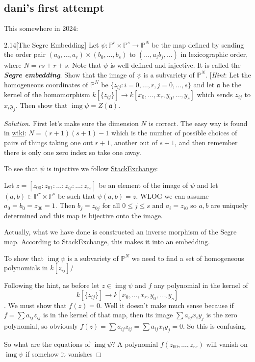 \subsection*{dani's first attempt}
This somewhere in 2024:
\begin{manualexercise}{2.14}[The Segre Embedding]
	Let $\psi:\mathbb{P}^r\times\mathbb{P}^s\to\mathbb{P}^N$ be the map defined by sending the order pair $(a_0,\ldots,a_r)\times(b_0,\ldots,b_s)$ to $(\ldots,a_ib_j,\ldots)$ in lexicographic order, where $N=rs+r+s$. Note that $\psi$ is well-defined and injective. It is called the \textbf{\textit{Segre embedding}}. Show that the image of $\psi$ is a subvariety of $\mathbb{P}^N$. [\textit{Hint}: Let the homogeneous coordinates of $\mathbb{P}^N$ be $\{z_{ij}:i=0,\ldots,r,j=0,\ldots,s\}$ and let $\mathfrak{a}$ be the kernel of the homomorphism $k[\{z_{ij}\}]\to k[x_0,\ldots,x_r,y_0,\ldots,y_s]$ which sends $z_{ij}$ to $x_iy_j$. Then show that $\operatorname{img}\psi=Z(\mathfrak{a})$.
\end{manualexercise}

\begin{proof}[Solution]
	First let's make sure the dimension $N$ is correct. The easy way is found in \href{https://en.wikipedia.org/wiki/Segre_embedding}{wiki}: $N=(r+1)(s+1)-1$ which is the number of possible choices of pairs of things taking one out $r+1$, another out of $s+1$, and then remember there is only one zero index so take one away.
	
	To see that $\psi$ is injective we follow \href{https://math.stackexchange.com/questions/3683364/segre-map-is-an-embedding}{StackExchange}: 
	{\color{azure}Let $z=[z_{00}:z_{01}:\ldots:z_{ij}:\ldots:z_{rs}]$ be an element of the image of $\psi$ and let $(a,b)\in\mathbb{P}^r\times\mathbb{P}^s$ be such that $\psi(a,b)=z$. WLOG we can assume $a_0=b_0=z_{00}=1$. Then $b_j=z_{0j}$ for all $0\leq j\leq s$ and $a_i=z_{i0}$ so $a,b$ are uniquely determined and this map is bijective onto the image.
	
	Actually, what we have done is constructed an inverse morphism of the Segre map. According to StackExchange, this makes it into an embedding.}
	
	To show that $\operatorname{img}\psi$ is a subvariety of $\mathbb{P}^N$ we need to find a set of homogeneous polynomials in $k[z_{ij}]$/
	
	Following the hint, as before let $z\in\operatorname{img}\psi$ and $f$ any polynomial in the kernel of \[k[\{z_{ij}\}]\to k[x_0,\ldots,x_r,y_0,\ldots,y_s]\]. We must show that $f(z)=0$. Well it doesn't make much sense because if $f=\sum a_{ij}z_{ij}$ is in the kernel of that map, then its image $\sum a_{ij}x_iy_j$ is the zero polynomial, so obviously $f(z)=\sum a_{ij}z_{ij}=\sum a_{ij}x_iy_j=0$. So this is confusing.
	
	So what are the equations of $\operatorname{img}\psi$? A polynomial $f(z_{00},\ldots,z_{rs})$ will vanish on $\operatorname{img}\psi$ if somehow it vanishes 
\end{proof}

